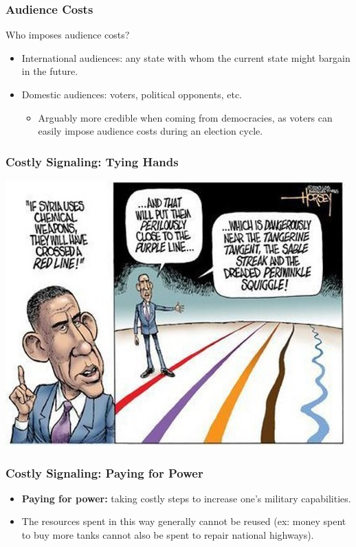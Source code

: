 \documentclass{beamer}
\begin{document}
\begin{frame}
\frametitle{\LARGE{Audience Costs}}
Who imposes audience costs? \pause
\begin{itemize}
	\item International audiences: any state with whom the current state might bargain in the future.
	\item Domestic audiences: voters, political opponents, etc. \pause
	\begin{itemize}
		\item Arguably more credible when coming from democracies, as voters can easily impose audience costs during an election cycle.
	\end{itemize}
\end{itemize}
\end{frame}

\begin{frame}
	\frametitle{\LARGE{Costly Signaling: Tying Hands}}
	\centering
	\includegraphics[width=\textwidth,height=0.8\textheight,keepaspectratio]{obamaredline.jpg}
\end{frame}


\begin{frame} 
	\frametitle{\LARGE{Costly Signaling: Paying for Power}}
	\begin{itemize}
		\item \textbf{Paying for power:} taking costly steps to increase one's military capabilities. \pause
		\item The resources spent in this way generally cannot be reused (ex: money spent to buy more tanks cannot also be spent to repair national highways). 

	\end{itemize}
\end{frame}
\end{document}
